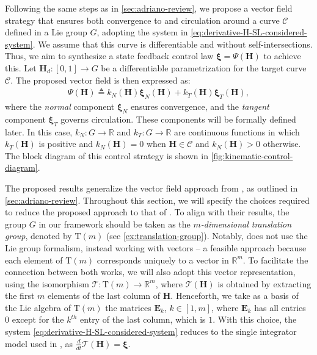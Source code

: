 Following the same steps as in \cref{sec:adriano-review}, we propose a vector field strategy that ensures both convergence to and circulation around a curve $\mathcal{C}$ defined in a Lie group $G$, adopting the system in \eqref{eq:derivative-H-SL-considered-system}. We assume that this curve is differentiable and without self-intersections. Thus, we aim to synthesize a state feedback control law $\boldsymbol{\xi}=\Psi\left(\mathbf{H}\right)$ to achieve this. Let $\mathbf{H}_d:[0,1] \to G$ be a differentiable parametrization for the target curve $\mathcal{C}$. The proposed vector field is then expressed as:
\begin{align}
    \Psi\left(\mathbf{H}\right) \triangleq k_N(\mathbf{H})\boldsymbol{\xi}_N(\mathbf{H}) + k_T(\mathbf{H})\boldsymbol{\xi}_T(\mathbf{H}), \label{eq:vector-field-proposition}
\end{align}
where the \emph{normal} component $\boldsymbol{\xi}_N$ ensures convergence, and the \emph{tangent} component $\boldsymbol{\xi}_T$ governs circulation. These components will be formally defined later. In this case, $k_N: G \to \mathbb{R}$ and $k_T: G \to \mathbb{R}$ are continuous functions in which $k_T(\mathbf{H})$ is positive and $k_N(\mathbf{H})=0$ when $\mathbf{H} \in \mathcal{C}$ and $k_N(\mathbf{H}) > 0$ otherwise. The block diagram of this control strategy is shown in \cref{fig:kinematic-control-diagram}.
\begin{remark}
    The proposed results generalize the vector field approach from \citet{Rezende2022}, as outlined in \cref{sec:adriano-review}. Throughout this section, we will specify the choices required to reduce the proposed approach to that of \citet{Rezende2022}. To align with their results, the group $G$ in our framework should be taken as the \emph{$m$-dimensional translation group}, denoted by $\text{T}(m)$ (see \cref{ex:translation-group}). Notably, \citet{Rezende2022}  does not use the Lie group formalism, instead working with vectors -- a feasible approach because each element of $\text{T}(m)$ corresponds uniquely to a vector in $\mathbb{R}^m$. To facilitate the connection between both works, we will also adopt this vector representation, using the isomorphism $\mathcal{T}: \text{T}(m) \to \mathbb{R}^m$, where $\mathcal{T}(\mathbf{H})$ is obtained by extracting the first $m$ elements of the last column of $\mathbf{H}$. Henceforth, we take as a basis of the Lie algebra of $\text{T}(m)$ the matrices $\mathbf{E}_k$, $k \in [1,m]$, where $\mathbf{E}_k$ has all entries $0$ except for the $k^{th}$ entry of the last column, which is $1$. With this choice, the system \eqref{eq:derivative-H-SL-considered-system} reduces to the single integrator model used in \citet{Rezende2022}, as $\frac{d}{dt} \mathcal{T}(\mathbf{H}) = \boldsymbol{\xi}$.  
\end{remark}

